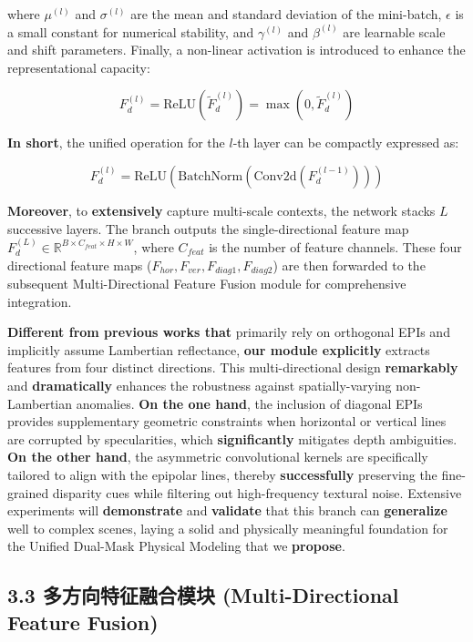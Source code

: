 where $\mu^{(l)}$ and $\sigma^{(l)}$ are the mean and standard deviation of the mini-batch, $\epsilon$ is a small constant for numerical stability, and $\gamma^{(l)}$ and $\beta^{(l)}$ are learnable scale and shift parameters. Finally, a non-linear activation is introduced to enhance the representational capacity:

\[
F_d^{(l)} = \text{ReLU}(\tilde{F}_d^{(l)}) = \max(0, \tilde{F}_d^{(l)}) \label{eq:relu}
\]

\textbf{In short}, the unified operation for the $l$-th layer can be compactly expressed as:

\[
F_d^{(l)} = \text{ReLU}\left(\text{BatchNorm}\left(\text{Conv2d}\left(F_d^{(l-1)}\right)\right)\right) \label{eq:directional_branch}
\]

\textbf{Moreover}, to \textbf{extensively} capture multi-scale contexts, the network stacks $L$ successive layers. The branch outputs the single-directional feature map $F_d^{(L)} \in \mathbb{R}^{B \times C_{feat} \times H \times W}$, where $C_{feat}$ is the number of feature channels. These four directional feature maps ($F_{hor}, F_{ver}, F_{diag1}, F_{diag2}$) are then forwarded to the subsequent Multi-Directional Feature Fusion module for comprehensive integration.

\textbf{Different from previous works that} primarily rely on orthogonal EPIs and implicitly assume Lambertian reflectance, \textbf{our module explicitly} extracts features from four distinct directions. This multi-directional design \textbf{remarkably} and \textbf{dramatically} enhances the robustness against spatially-varying non-Lambertian anomalies. \textbf{On the one hand}, the inclusion of diagonal EPIs provides supplementary geometric constraints when horizontal or vertical lines are corrupted by specularities, which \textbf{significantly} mitigates depth ambiguities. \textbf{On the other hand}, the asymmetric convolutional kernels are specifically tailored to align with the epipolar lines, thereby \textbf{successfully} preserving the fine-grained disparity cues while filtering out high-frequency textural noise. Extensive experiments will \textbf{demonstrate} and \textbf{validate} that this branch can \textbf{generalize} well to complex scenes, laying a solid and physically meaningful foundation for the Unified Dual-Mask Physical Modeling that we \textbf{propose}.

\subsection{3.3 多方向特征融合模块 (Multi-Directional Feature Fusion)}

